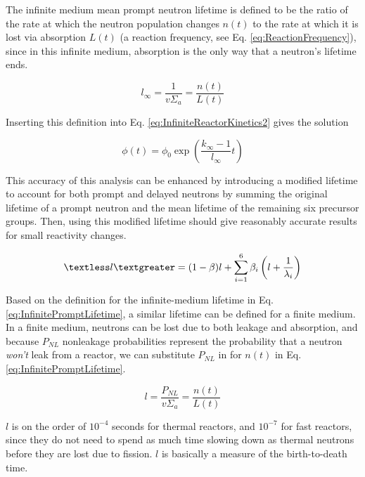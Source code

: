 \documentclass[10pt]{article}
\begin{document}
\begin{flushleft}
The infinite medium mean prompt neutron lifetime is defined to be the ratio of the rate at which the neutron population changes \(n(t)\) to the rate at which it is lost via absorption \(L(t)\) (a reaction frequency, see Eq. \ref{eq:ReactionFrequency}), since in this infinite medium, absorption is the only way that a neutron's lifetime ends. 

\begin{equation}
\label{eq:InfinitePromptLifetime}
l_\infty=\frac{1}{v\Sigma_a}=\frac{n(t)}{L(t)}
\end{equation}

Inserting this definition into Eq. \ref{eq:InfiniteReactorKinetics2} gives the solution

\begin{equation}
\label{eq:InfiniteReactorKineticsSolution}
\phi(t)=\phi_0\exp\left(\frac{k_\infty-1}{l_\infty}t\right)
\end{equation}

This accuracy of this analysis can be enhanced by introducing a modified lifetime to account for both prompt and delayed neutrons by summing the original lifetime of a prompt neutron and the mean lifetime of the remaining six precursor groups. Then, using this modified lifetime should give reasonably accurate results for small reactivity changes. 

\begin{equation}
\label{eq:AdjustedLifetime}
\textless l\textgreater=(1-\beta)l+\sum_{i=1}^{6} \beta_i\left(l+\frac{1}{\lambda_i}\right)
\end{equation}

Based on the definition for the infinite-medium lifetime in Eq. \ref{eq:InfinitePromptLifetime}, a similar lifetime can be defined for a finite medium. In a finite medium, neutrons can be lost due to both leakage and absorption, and because \(P_{NL}\) nonleakage probabilities represent the probability that a neutron \textit{won't} leak from a reactor, we can substitute \(P_{NL}\) in for \(n(t)\) in Eq. \ref{eq:InfinitePromptLifetime}.

\begin{equation}
\label{eq:FinitePromptLifetime}
l=\frac{P_{NL}}{v\Sigma_a}=\frac{n(t)}{L(t)}
\end{equation}

\(l\) is on the order of \(10^{-4}\) seconds for thermal reactors, and \(10^{-7}\) for fast reactors, since they do not need to spend as much time slowing down as thermal neutrons before they are lost due to fission. \(l\) is basically a measure of the birth-to-death time.


\end{flushleft}
\end{document}
